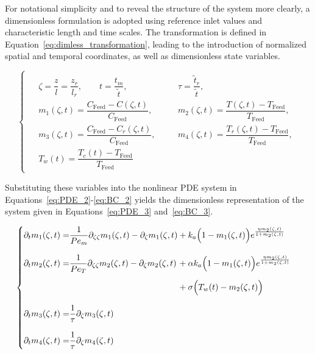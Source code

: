 For notational simplicity and to reveal the structure of the system more clearly, a dimensionless formulation is adopted using reference inlet values and characteristic length and time scales. The transformation is defined in Equation~\eqref{eq:dimless_transformation}, leading to the introduction of normalized spatial and temporal coordinates, as well as dimensionless state variables. 

\begin{equation} \label{eq:dimless_transformation}
\begin{cases}
    \begin{alignedat}{2}
        &\zeta = \dfrac{z}{l} = \dfrac{z_r}{l_r}, \qquad 
        t = \dfrac{t_m}{\tilde{t}}, \qquad
        &&\tau = \dfrac{\tilde{t}_r}{\tilde{t}}, \\[2.0ex]
        &m_1(\zeta, t) = \dfrac{C_{\text{Feed}} - C(\zeta, t)}{C_{\text{Feed}}}, \quad 
        &&m_2(\zeta, t) = \dfrac{T(\zeta, t) - T_{\text{Feed}}}{T_{\text{Feed}}}, \\[1.5ex]
        &m_3(\zeta, t) = \dfrac{C_{\text{Feed}} - C_r(\zeta, t)}{C_{\text{Feed}}}, \quad 
        &&m_4(\zeta, t) = \dfrac{T_r(\zeta, t) - T_{\text{Feed}}}{T_{\text{Feed}}}, \\[1.5ex]
        &T_w(t) = \dfrac{T_c(t) - T_{\text{Feed}}}{T_{\text{Feed}}}
    \end{alignedat}
\end{cases}
\end{equation}

Substituting these variables into the nonlinear PDE system in Equations~\eqref{eq:PDE_2}-\eqref{eq:BC_2} yields the dimensionless representation of the system given in Equations~\eqref{eq:PDE_3} and~\eqref{eq:BC_3}. 


\begin{equation} \label{eq:PDE_3}
\begin{cases}
\begin{alignedat}{2}
    \partial_{t} m_1(\zeta, t) = &\dfrac{1}{Pe_m} \partial_{\zeta\zeta} m_1(\zeta, t) 
    -\partial_{\zeta} m_1(\zeta, t) 
    &&+ k_a \Bigl( 1 - m_1(\zeta, t) \Bigr) e^{\frac{\eta m_2(\zeta, t)}{1 + m_2(\zeta, t)}} \\[2.0ex]

    \partial_{t} m_2(\zeta, t) = &\dfrac{1}{Pe_T} \partial_{\zeta\zeta} m_2(\zeta, t) 
    -\partial_{\zeta} m_2(\zeta, t)
    &&+ \alpha k_a \Bigl( 1 - m_1(\zeta, t) \Bigr) e^{\frac{\eta m_2(\zeta, t)}{1 + m_2(\zeta, t)}} \\[1.2ex]
    &&&+ \sigma \Bigl( T_w(t) - m_2(\zeta, t)\Bigr) \\[2.0ex]

    \partial_{t} m_3(\zeta, t) = &\frac{1}{\tau} \partial_{\zeta} m_3(\zeta, t) \\[2.0ex]

    \partial_{t} m_4(\zeta, t) = &\frac{1}{\tau} \partial_{\zeta} m_4(\zeta, t)
\end{alignedat}
\end{cases}
\end{equation}

